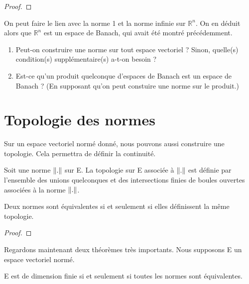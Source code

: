 \ifdefined\outputproof
\begin{proof}

\end{proof}
\fi

\begin{exemple}
	On peut faire le lien avec la norme 1 et la norme infinie sur
	$\mathbb{R}^{n}$. On en déduit alors que $\mathbb{R}^{n}$ est un espace de
	Banach, qui avait été montré précédemment.
\end{exemple}

\begin{question}
	\begin{enumerate}
		\item Peut-on construire une norme sur tout espace vectoriel ?
			Sinon, quelle(s) condition(s) supplémentaire(s) a-t-on besoin ?
		\item Est-ce qu'un produit quelconque d'espaces de Banach est un
			espace de Banach ? (En supposant qu'on peut constuire une norme
			sur le produit.)
	\end{enumerate}
\end{question}

\section{Topologie des normes}

Sur un espace vectoriel normé donné, nous pouvons aussi construire une
topologie. Cela permettra de définir la continuité.

\begin{definition}
	Soit une norme $\norm{.}$ sur E. La topologie sur E associée à $\norm{.}$
	est définie par l'ensemble des unions quelconques et des intersections
	finies de boules ouvertes associées à la norme $\norm{.}$.
\end{definition}

\begin{proposition}
	Deux normes sont équivalentes si et seulement si elles définissent la même topologie.
\end{proposition}

\ifdefined\outputproof
\begin{proof}

\end{proof}
\fi

Regardons maintenant deux théorèmes très importants. Nous supposons E un espace
vectoriel normé.

\begin{theorem}
	E est de dimension finie si et seulement si toutes les normes sont équivalentes.
\end{theorem}

